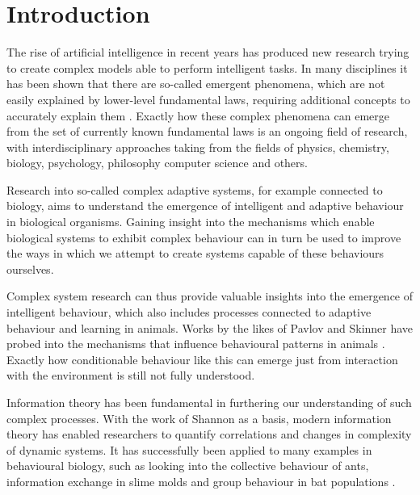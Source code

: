 \documentclass[12pt,a4paper]{article}
\begin{document}

\newpage
\tableofcontents
\thispagestyle{empty}
\newpage
{}

\section{Introduction} \label{sec:introduction}
The rise of artificial intelligence in recent years has produced new research trying to create complex models able to perform intelligent tasks.
In many disciplines it has been shown that there are so-called emergent phenomena, which are not easily explained by lower-level fundamental laws, requiring additional concepts to accurately explain them \autocite{anderson1972more}.
Exactly how these complex phenomena can emerge from the set of currently known fundamental laws is an ongoing field of research, with interdisciplinary approaches taking from the fields of physics, chemistry, biology, psychology, philosophy computer science and others.

Research into  so-called complex adaptive systems, for example connected to biology, aims to understand the emergence of intelligent and adaptive behaviour in biological organisms.
Gaining insight into the mechanisms which enable biological systems to exhibit complex behaviour can in turn be used to improve the ways in which we attempt to create systems capable of these behaviours ourselves.

Complex system research can thus provide valuable insights into the emergence of intelligent behaviour, which also includes processes connected to adaptive behaviour and learning in animals.
Works by the likes of Pavlov and Skinner have probed into the mechanisms that influence behavioural patterns in animals \autocite{pavlov1906scientific, skinner1957experimental}.
Exactly how conditionable behaviour like this can emerge just from interaction with the environment is still not fully understood.

Information theory has been fundamental in furthering our understanding of such complex processes.
With the work of Shannon \autocite{shannon1948} as a basis, modern information theory has enabled researchers to quantify correlations and changes in complexity of dynamic systems.
It has successfully been applied to many examples in behavioural biology, such as looking into the collective behaviour of ants, information exchange in slime molds and group behaviour in bat populations \autocite{kim2021informational}.
\end{document}
